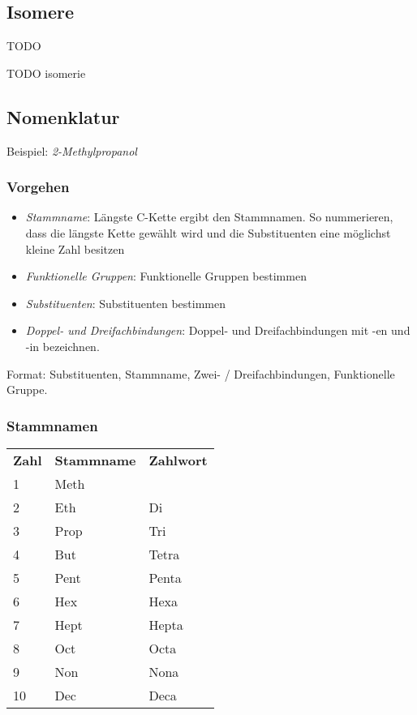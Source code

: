 \subsection{Isomere}

\begin{definition}[Chiralität]
	TODO
\end{definition}

TODO isomerie

\subsection{Nomenklatur}

Beispiel: \textit{2-Methylpropanol}

\subsubsection{Vorgehen}

\begin{itemize}
	\item \textit{Stammname}: Längste C-Kette ergibt den Stammnamen. So nummerieren, dass die längste Kette gewählt wird und die Substituenten eine möglichst kleine Zahl besitzen
	\item \textit{Funktionelle Gruppen}: Funktionelle Gruppen bestimmen
	\item \textit{Substituenten}: Substituenten bestimmen
	\item \textit{Doppel- und Dreifachbindungen}: Doppel- und Dreifachbindungen mit -en und -in bezeichnen.
\end{itemize}

Format: Substituenten, Stammname, Zwei- / Dreifachbindungen, Funktionelle Gruppe.
\subsubsection{Stammnamen}

\begin{center}
	\begin{tabular}{ l  l  l }
		\textbf{Zahl} & \textbf{Stammname} & \textbf{Zahlwort} \\
		1 & Meth & \\
		2 & Eth & Di\\
		3 & Prop & Tri\\
		4 & But & Tetra\\
		5 & Pent & Penta\\
		6 & Hex & Hexa\\
		7 & Hept & Hepta\\
		8 & Oct & Octa\\
		9 & Non &Nona\\
		10 & Dec &Deca\\
	\end{tabular}
\end{center}

